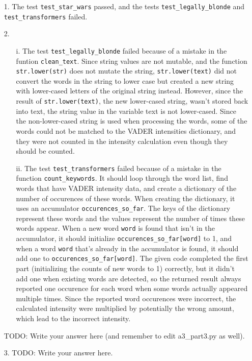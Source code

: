 \documentclass[fontsize=11pt]{article}
\begin{document}
\begin{enumerate}
\item[1.]
The test \texttt{test\_star\_wars} passed, and the tests 
\texttt{test\_legally\_blonde} and \texttt{test\_transformers} failed.

\item[2.]
\begin{enumerate}
    \item[i.] The test \texttt{test\_legally\_blonde} failed because of a mistake in the funtion \texttt{clean\_text}. Since string values are not mutable, and the function \texttt{str.lower(str)} does not mutate the string, \texttt{str.lower(text)} did not convert the words in the string to lower case but created a new string with lower-cased letters of the original string instead. However, since the result of \texttt{str.lower(text)}, the new lower-cased string, wasn't stored back into text, the string value in the variable text is not lower-cased. Since the non-lower-cased string is used when processing the words, some of the words could not be matched to the VADER intensities dictionary, and they were not counted in the intensity calculation even though they should be counted.
    \item[ii.] The test \texttt{test\_transformers} failed because of a mistake in the function \texttt{count\_keywords}. It should loop through the word list, find words that have VADER intensity data, and create a dictionary of the number of occurences of these words. When creating the dictionary, it uses an accumulator \texttt{occurences\_so\_far}. The keys of the dictionary represent these words and the values represent the number of times these words appear. When a new word \texttt{word} is found that isn't in the accumulator, it should initialize \texttt{occurences\_so\_far[word]} to 1, and when a word \texttt{word} that's already in the accumulator is found, it should add one to \texttt{occurences\_so\_far[word]}. The given code completed the first part (initializing the counts of new words to 1) correctly, but it didn't add one when existing words are detected, so the returned result always reported one occurence for each word when some words actually appeared multiple times. Since the reported word occurences were incorrect, the calculated intensity were multiplied by potentially the wrong amount, which lead to the incorrect intensity.
\end{enumerate} 
TODO: Write your answer here (and remember to edit a3\_part3.py as well).

\item[3.]
TODO: Write your answer here.
\end{enumerate}
\end{document}
